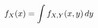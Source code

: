 \documentclass[preview]{standalone}
\begin{document}
\begin{align*}
\special{dvisvgm:raw <g id='unique000'>}f_X(x)=\int f_{X,Y}(x,y)\,dy\special{dvisvgm:raw </g>}
\end{align*}
\end{document}

